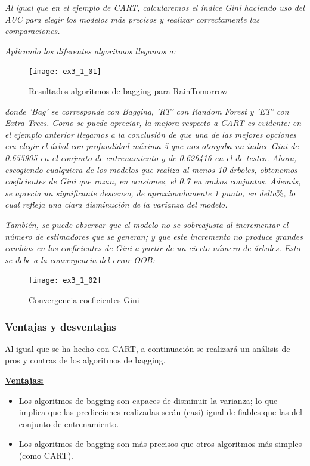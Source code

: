 \documentclass[12pt,twoside]{article}
\begin{document}
\textit{Al igual que en el ejemplo de CART, calcularemos el índice Gini haciendo uso del AUC para elegir los modelos más precisos y realizar correctamente las comparaciones.}

\textit{Aplicando los diferentes algoritmos llegamos a: }

\begin{figure}[h]
\centering
\texttt{[image: ex3\_1\_01]}
\caption{Resultados algoritmos de bagging para RainTomorrow}
\end{figure}

\noindent
\textit{donde 'Bag' se corresponde con Bagging, 'RT' con Random Forest y 'ET' con Extra-Trees. Como se puede apreciar, la mejora respecto a CART es evidente: en el ejemplo anterior llegamos a la conclusión de que una de las mejores opciones era elegir el árbol con profundidad máxima 5 que nos otorgaba un índice Gini de 0.655905 en el conjunto de entrenamiento y de 0.626416 en el de testeo. Ahora, escogiendo cualquiera de los modelos que realiza al menos 10 árboles, obtenemos coeficientes de Gini que rozan, en ocasiones, el 0.7 en ambos conjuntos. Además, se aprecia un significante descenso, de aproximadamente 1 punto, en delta$\%$, lo cual refleja una clara disminución de la varianza del modelo.}

\textit{También, se puede observar que el modelo no se sobreajusta al incrementar el número de estimadores que se generan; y que este incremento no produce grandes cambios en los coeficientes de Gini a partir de un cierto número de árboles. Esto se debe a la convergencia del error OOB:}

\begin{figure}[h]
\centering
\texttt{[image: ex3\_1\_02]}
\caption{Convergencia coeficientes Gini}
\end{figure}


\subsubsection{Ventajas y desventajas}
Al igual que se ha hecho con CART, a continuación se realizará un análisis de pros y contras de los algoritmos de bagging.

\textbf{\underline{Ventajas:}}
\begin{itemize}
\item Los algoritmos de bagging son capaces de disminuir la varianza; lo que implica que las predicciones realizadas serán (casi) igual de fiables que las del conjunto de entrenamiento.
\item Los algoritmos de bagging son más precisos que otros algoritmos más simples (como CART).
\end{itemize}
\end{document}
